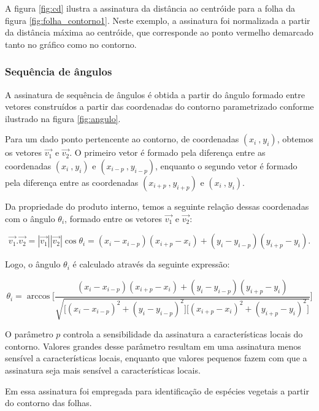A figura \ref{fig:cd} ilustra a assinatura da distância ao centróide para a folha da figura \ref{fig:folha_contorno1}. Neste exemplo, a assinatura foi normalizada a partir da distância máxima ao centróide, que corresponde ao ponto vermelho demarcado tanto no gráfico como no contorno. 

\subsubsection{Sequência de ângulos}

A assinatura de sequência de ângulos é obtida a partir do ângulo formado entre vetores construídos a partir das coordenadas do contorno parametrizado conforme ilustrado na figura \ref{fig:angulo}. 

Para um dado ponto pertencente ao contorno, de coordenadas $(x_i\:\text{,}\:y_i)$, obtemos os vetores $\overrightarrow{v_1}$ e $\overrightarrow{v_2}$. O primeiro vetor é formado pela diferença entre as coordenadas $(x_i\:\text{,}\:y_i)$ e $(x_{i-p}\:\text{,}\:y_{i-p})$, enquanto o segundo vetor é formado pela diferença entre as coordenadas $(x_{i+p}\:\text{,}\:y_{i+p})$ e $(x_i\:\text{,}\:y_i)$. 

Da propriedade do produto interno, temos a seguinte relação dessas coordenadas com o ângulo $\theta_i$, formado entre os vetores $\overrightarrow{v_1}$ e $\overrightarrow{v_2}$:

\begin{equation}
\overrightarrow{v_1}. \overrightarrow{v_2} = |\overrightarrow{v_1}||\overrightarrow{v_2}|\cos{\theta_i}=(x_i-x_{i-p})(x_{i+p}-x_i)+(y_i-y_{i-p})(y_{i+p}-y_i).
\end{equation}

Logo, o ângulo $\theta_i$ é calculado através da seguinte expressão:

\begin{equation}
\theta_i = \arccos{\Big[\frac{(x_i-x_{i-p})(x_{i+p}-x_i)+(y_i-y_{i-p})(y_{i+p}-y_i)}{\sqrt{\big[(x_i-x_{i-p})^2+(y_i-y_{i-p})^2\big]\big[(x_{i+p}-x_i)^2+(y_{i+p}-y_i)^2\big]}}\Big]}
\end{equation}

O parâmetro $p$ controla a sensibilidade da assinatura a características locais do contorno. Valores grandes desse parâmetro resultam em uma assinatura menos sensível a características locais, enquanto que valores pequenos fazem com que a assinatura seja mais sensível a características locais. 

Em \cite{Fotopoulou:2013} essa assinatura foi empregada para identificação de espécies vegetais a partir do contorno das folhas.

